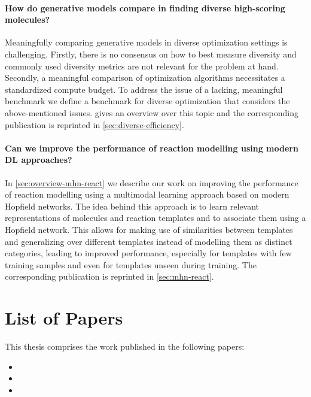 \paragraph{How do generative models compare in finding diverse high-scoring molecules?}
Meaningfully comparing generative models in diverse optimization settings is challenging.
Firstly, there is no consensus on how to best measure diversity and commonly used
diversity metrics are not relevant for the problem at hand. Secondly, a meaningful
comparison of optimization algorithms necessitates a standardized compute budget.
To address the issue of a lacking, meaningful benchmark we define a
benchmark for diverse optimization that considers the above-mentioned issues.
 gives an overview over this topic
and the corresponding publication is reprinted in \cref{sec:diverse-efficiency}.

\paragraph{Can we improve the performance of reaction modelling using modern DL approaches?}
In \cref{sec:overview-mhn-react} we describe our work on improving the performance
of reaction modelling using a multimodal learning approach based on modern
Hopfield networks. The idea behind this approach is to learn relevant representations
of molecules and reaction templates and to associate them using a Hopfield network.
This allows for making use of similarities between templates and generalizing over
different templates instead of modelling them as distinct categories, leading to
improved performance, especially for templates with few training samples and even
for templates unseen during training.
The corresponding publication is reprinted in \cref{sec:mhn-react}.

\section{List of Papers}
This thesis comprises the work published in the following papers:

\begin{itemize}
    \item {}
    \item {}
    \item {}
\end{itemize}

